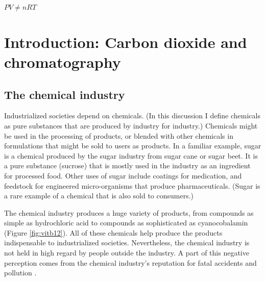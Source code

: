 
\begin{savequote}[\quotewidth]
$PV \ne nRT$
\end{savequote}

\chapter{Introduction: Carbon dioxide and chromatography} %

\label{Chapter2} %



\section{The chemical industry}

Industrialized societies depend on chemicals. (In this discussion I define
chemicals as pure substances that are produced by industry for industry.)
Chemicals might be used in the processing of products, or blended with other
chemicals in formulations that might be sold to users as products. In a familiar
example, sugar is a chemical produced by the sugar industry from sugar cane or
sugar beet. It is a pure substance (sucrose) that is mostly used in the industry
as an ingredient for processed food. Other uses of sugar include coatings for
medication, and feedstock for engineered micro-organisms that produce
pharmaceuticals. (Sugar is a rare example of a chemical that is also sold to
consumers.)
 
The chemical industry produces a huge variety of products, from compounds as
simple as hydrochloric acid to compounds as sophisticated as cyanocobalamin
(Figure \ref{fig:vitb12}). All of these chemicals help produce the products
indispensable to industrialized societies. Nevertheless, the chemical industry
is not held in high regard by people outside the industry. A part of this
negative perception comes from the chemical industry's reputation for fatal
accidents and pollution \autocite{Gumm2015}.

